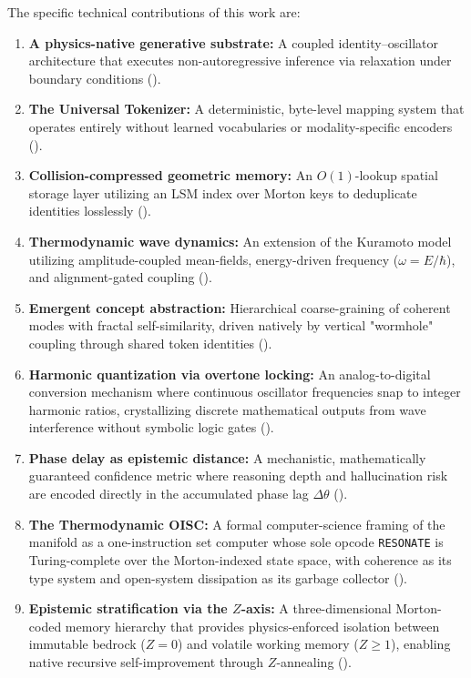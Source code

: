 \documentclass[11pt,a4paper]{article}
\begin{document}
The specific technical contributions of this work are:
\begin{enumerate}[nosep]
  \item \textbf{A physics-native generative substrate:} A coupled identity--oscillator architecture that executes non-autoregressive inference via relaxation under boundary conditions ().
  \item \textbf{The Universal Tokenizer:} A deterministic, byte-level mapping system that operates entirely without learned vocabularies or modality-specific encoders ().
  \item \textbf{Collision-compressed geometric memory:} An $O(1)$-lookup spatial storage layer utilizing an LSM index over Morton keys to deduplicate identities losslessly ().
  \item \textbf{Thermodynamic wave dynamics:} An extension of the Kuramoto model utilizing amplitude-coupled mean-fields, energy-driven frequency ($\omega=E/\hbar$), and alignment-gated coupling ().
  \item \textbf{Emergent concept abstraction:} Hierarchical coarse-graining of coherent modes with fractal self-similarity, driven natively by vertical "wormhole" coupling through shared token identities ().
  \item \textbf{Harmonic quantization via overtone locking:} An analog-to-digital conversion mechanism where continuous oscillator frequencies snap to integer harmonic ratios, crystallizing discrete mathematical outputs from wave interference without symbolic logic gates ().
  \item \textbf{Phase delay as epistemic distance:} A mechanistic, mathematically guaranteed confidence metric where reasoning depth and hallucination risk are encoded directly in the accumulated phase lag $\Delta\theta$ ().
  \item \textbf{The Thermodynamic OISC:} A formal computer-science framing of the manifold as a one-instruction set computer whose sole opcode \texttt{RESONATE} is Turing-complete over the Morton-indexed state space, with coherence as its type system and open-system dissipation as its garbage collector ().
  \item \textbf{Epistemic stratification via the $Z$-axis:} A three-dimensional Morton-coded memory hierarchy that provides physics-enforced isolation between immutable bedrock ($Z\!=\!0$) and volatile working memory ($Z \ge 1$), enabling native recursive self-improvement through $Z$-annealing ().

\end{enumerate}
\end{document}
